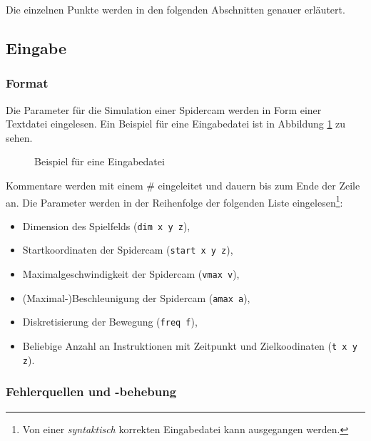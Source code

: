 Die einzelnen Punkte werden in den folgenden Abschnitten genauer erläutert.


\subsection{Eingabe}
\label{ssec:eingabe}


\subsubsection{Format}
\label{sssec:format}

Die Parameter für die Simulation einer Spidercam werden in Form einer Textdatei eingelesen.
Ein Beispiel für eine Eingabedatei ist in Abbildung \ref{fig:example_input} zu sehen.

\begin{figure}[H]
    \centering
    
    \caption{Beispiel für eine Eingabedatei}
    \label{fig:example_input}
\end{figure}

Kommentare werden mit einem \# eingeleitet und dauern bis zum Ende der Zeile an.
Die Parameter werden in der Reihenfolge der folgenden Liste eingelesen\footnote{Von einer \emph{syntaktisch} korrekten Eingabedatei kann ausgegangen werden.}:
\begin{itemize}
    \item Dimension des Spielfelds (\texttt{dim x y z}),
    \item Startkoordinaten der Spidercam (\texttt{start x y z}),
    \item Maximalgeschwindigkeit der Spidercam (\texttt{vmax v}),
    \item (Maximal-)Beschleunigung der Spidercam (\texttt{amax a}),
    \item Diskretisierung der Bewegung (\texttt{freq f}),
    \item Beliebige Anzahl an Instruktionen mit Zeitpunkt und Zielkoodinaten (\texttt{t x y z}).
\end{itemize}

\subsubsection{Fehlerquellen und -behebung}
\label{sssec:fehlerquellen_und_-behebung}

